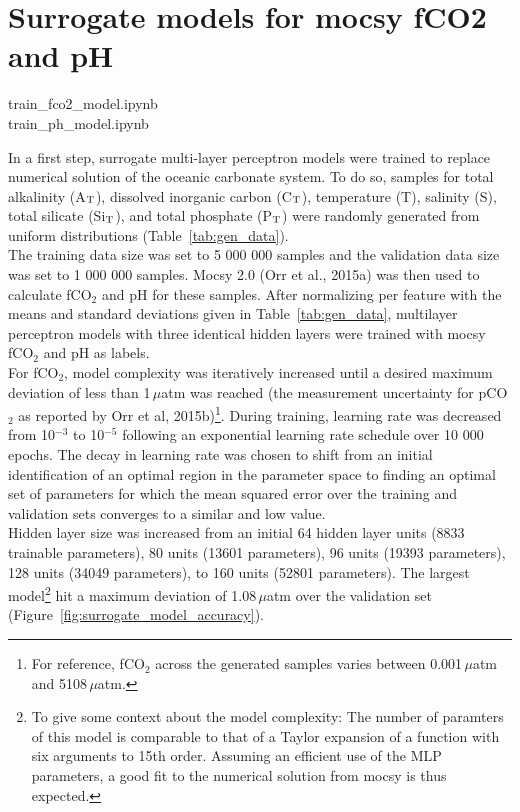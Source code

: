\documentclass{article}
\begin{document}
	\section{Surrogate models for mocsy fCO2 and pH} \label{sect:surrgate_models}
	\begin{tcolorbox}[colback=gray!5!white, colframe=black!75!white, 
		fonttitle=\bfseries, title=Jupyter Notebooks, 
		rounded corners, width=\textwidth]
		train\_fco2\_model.ipynb \\
		train\_ph\_model.ipynb
	\end{tcolorbox}
	In a first step, surrogate multi-layer perceptron models were trained to replace numerical solution of the oceanic carbonate system. To do so, samples for total alkalinity (A$_\textup{T}$), dissolved inorganic carbon (C$_\textup{T}$), temperature (T),  salinity (S), total silicate (Si$_\textup{T}$), and total phosphate (P$_\textup{T}$) were randomly generated from uniform distributions (Table~\ref{tab:gen_data}). \\
	The training data size was set to 5 000 000 samples and the validation data size was set to 1 000 000 samples. Mocsy 2.0 (Orr et al., 2015a) was then used to calculate fCO$_2$ and pH for these samples. After normalizing per feature with the means and standard deviations given in Table~\ref{tab:gen_data}, multilayer perceptron models with three identical hidden layers were trained with mocsy fCO$_2$ and pH as labels. \\
	For fCO$_2$, model complexity was iteratively increased until a desired maximum deviation of less than 1\,$\mu$atm was reached (the measurement uncertainty for pCO$_2$ as reported by Orr et al, 2015b)\footnote{For reference, fCO$_2$ across the generated samples varies between 0.001\,$\mu$atm and 5108\,$\mu$atm.}. During training, learning rate was decreased from 10$^{-3}$ to 10$^{-5}$ following an exponential learning rate schedule over 10 000 epochs. The decay in learning rate was chosen to shift from an initial identification of an optimal region in the parameter space to finding an optimal set of parameters for which the mean squared error over the training and validation sets converges to a similar and low value. \\
	Hidden layer size was increased from an initial 64 hidden layer units (8833 trainable parameters), 80 units (13601 parameters), 96 units (19393 parameters), 128 units (34049 parameters), to 160 units (52801 parameters). The largest model\footnote{To give some context about the model complexity: The number of paramters of this model is comparable to that of a Taylor expansion of a function with six arguments to 15th order. Assuming an efficient use of the MLP parameters, a good fit to the numerical solution from mocsy is thus expected.} hit a maximum deviation of 1.08\,$\mu$atm over the validation set (Figure~\ref{fig:surrogate_model_accuracy}).
\end{document}

